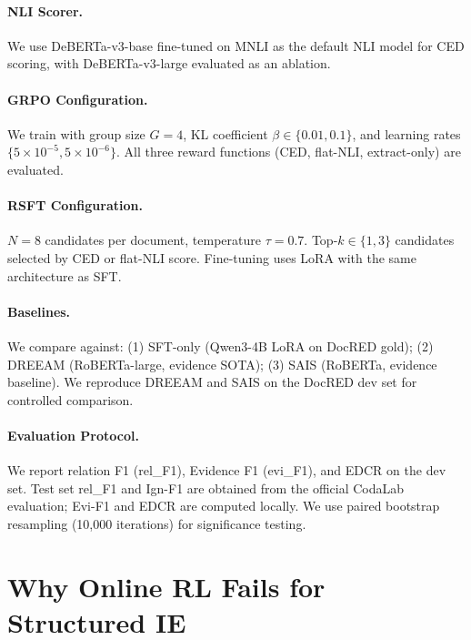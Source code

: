 \documentclass[11pt,a4paper]{article}
\begin{document}
\paragraph{NLI Scorer.}
We use DeBERTa-v3-base fine-tuned on MNLI as the default NLI model for CED scoring, with DeBERTa-v3-large evaluated as an ablation.

\paragraph{GRPO Configuration.}
We train with group size $G=4$, KL coefficient $\beta \in \{0.01, 0.1\}$, and learning rates $\{5 \times 10^{-5}, 5 \times 10^{-6}\}$.
All three reward functions (CED, flat-NLI, extract-only) are evaluated.

\paragraph{RSFT Configuration.}
$N=8$ candidates per document, temperature $\tau=0.7$.
Top-$k \in \{1, 3\}$ candidates selected by CED or flat-NLI score.
Fine-tuning uses LoRA with the same architecture as SFT.

\paragraph{Baselines.}
We compare against: (1) SFT-only (Qwen3-4B LoRA on DocRED gold); (2) DREEAM \citep{ma2023dreeam} (RoBERTa-large, evidence SOTA); (3) SAIS \citep{xie2022sais} (RoBERTa, evidence baseline).
We reproduce DREEAM and SAIS on the DocRED dev set for controlled comparison.

\paragraph{Evaluation Protocol.}
We report relation F1 (rel\_F1), Evidence F1 (evi\_F1), and EDCR on the dev set.
Test set rel\_F1 and Ign-F1 are obtained from the official CodaLab evaluation; Evi-F1 and EDCR are computed locally.
We use paired bootstrap resampling (10,000 iterations) for significance testing.

\section{Why Online RL Fails for Structured IE}
\label{sec:grpo_analysis}
\end{document}
